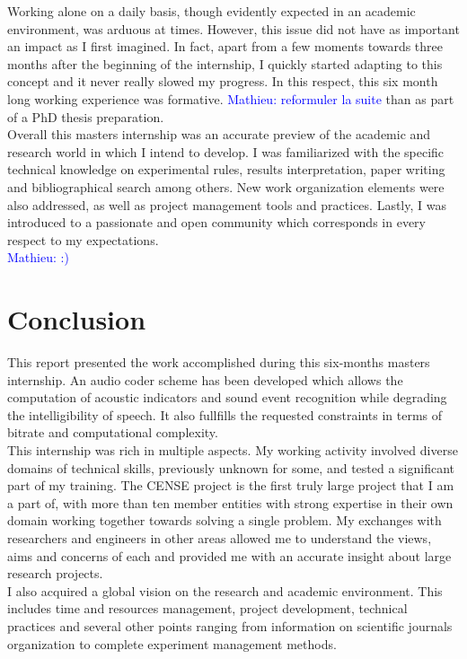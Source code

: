 \documentclass[12pt,times,onecolumn]{article}
\newcommand{\ml}[1]{\textcolor{blue}{ Mathieu: #1}}
\begin{document}
Working alone on a daily basis, though evidently expected in an academic environment, was arduous at times. However, this issue did not have as important an impact as I first imagined. In fact, apart from a few moments towards three months after the beginning of the internship, I quickly started adapting to this concept and it never really slowed my progress. In this respect, this six month long working experience was formative. \ml{reformuler la suite} than as part of a PhD thesis preparation.\\

Overall this masters internship was an accurate preview of the academic and research world in which I intend to develop. I was familiarized with the specific technical knowledge on experimental rules, results interpretation, paper writing and bibliographical search among others. New work organization elements were also addressed, as well as project management tools and practices. Lastly, I was introduced to a passionate and open community which corresponds in every respect to my expectations.\\

\ml{:)}

\clearpage
\section*{Conclusion}
This report presented the work accomplished during this six-months masters internship. An audio coder scheme has been developed which allows the computation of acoustic indicators and sound event recognition while degrading the intelligibility of speech. It also fullfills the requested constraints in terms of bitrate and computational complexity.\\


This internship was rich in multiple aspects. My working activity involved diverse domains of technical skills, previously unknown for some, and tested a significant part of my training. The CENSE project is the first truly large project that I am a part of, with more than ten member entities with strong expertise in their own domain working together towards solving a single problem. My exchanges with researchers and engineers in other areas allowed me to understand the views, aims and concerns of each and provided me with an accurate insight about large research projects.\\

I also acquired a global vision on the research and academic environment. This includes time and resources management, project development, technical practices and several other points ranging from information on scientific journals organization to complete experiment management methods.\\
\end{document}
